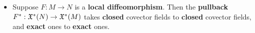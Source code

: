 \documentclass[11pt]{article}
\begin{document}
\begin{itemize}
\item \begin{corollary}
Suppose $F: M \rightarrow N$ is a \textbf{local diffeomorphism}. Then the \textbf{pullback} $F^{*}: {\mathfrak X}^{*}(N)  \rightarrow {\mathfrak X}^{*}(M)$ takes \textbf{closed} covector fields to \textbf{closed} covector fields, and \textbf{exact} ones to \textbf{exact} ones.
\end{corollary}
\end{itemize}


\newpage


\end{document}
